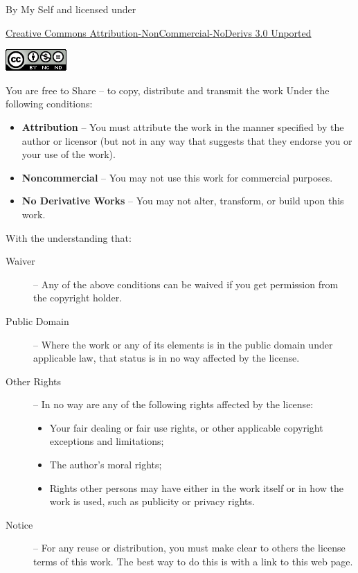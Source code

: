 \thispagestyle{empty}


\noindent By My Self and licensed under

\noindent
\href{http://creativecommons.org/licenses/by-nc-nd/3.0/}{Creative Commons Attribution-NonCommercial-NoDerivs 3.0 Unported}

\noindent
\href{http://creativecommons.org/licenses/by-nc-nd/3.0/}{\includegraphics{ch00/pics/creative-commons.png}}

\vfill

\noindent You are free to Share -- to copy, distribute and transmit the work
Under the following conditions:

\begin{itemize}
\item \textbf{Attribution} -- You must attribute the work in the manner
  specified by the author or licensor (but not in any way that
  suggests that they endorse you or your use of the work).
\item 
  \textbf{Noncommercial} -- You may not use this work for commercial purposes.
\item 
  \textbf{No Derivative Works} -- You may not alter, transform, or build upon
  this work.
\end{itemize}

\noindent With the understanding that:

\begin{description}
\item[Waiver] -- Any of the above conditions can be waived if you
  get permission from the copyright holder.  
\item[Public Domain] -- Where
  the work or any of its elements is in the public domain under
  applicable law, that status is in no way affected by the license.
\item[Other Rights] -- In no way are any of the following rights affected
  by the license: 
  \begin{itemize}
  \item Your fair dealing or fair use rights, or other applicable
    copyright exceptions and limitations;
  \item The author's moral rights;
  \item Rights other persons may have either in the work itself or in how
    the work is used, such as publicity or privacy rights.
  \end{itemize}
\item[Notice] -- For any reuse or distribution, you must make clear to
  others the license terms of this work. The best way to do this is
  with a link to this web page.
\end{description}




